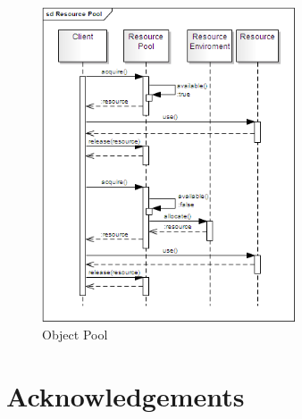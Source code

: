 \documentclass[11pt]{article}
\begin{document}
\begin{figure}[!ht]
\begin{center}
\includegraphics[width=7.5cm]{resource_pool}
\end{center}
\caption{Object Pool}
\label{fig:rp}
\end{figure}

\section{Acknowledgements}





\end{document}
